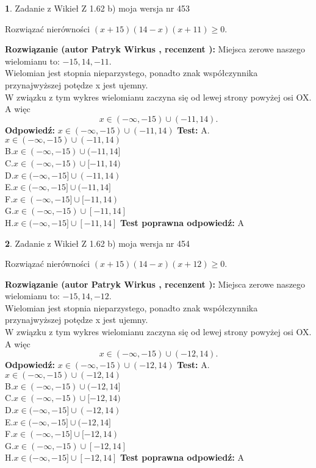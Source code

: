 \documentclass[12pt, a4paper]{article}
\theoremstyle{definition} %
\newtheorem{zad}{}
\newcommand{\zadStart}[1]{\begin{zad}#1\newline}
\newcommand{\zadStop}{\end{zad}}
\newcommand{\rozwStart}[2]{\noindent \textbf{Rozwiązanie (autor #1 , recenzent #2): }\newline}
\newcommand{\rozwStop}{\newline}
\newcommand{\odpStart}{\noindent \textbf{Odpowiedź:}\newline}
\newcommand{\odpStop}{\newline}
\newcommand{\testStart}{\noindent \textbf{Test:}\newline}
\newcommand{\testStop}{\newline}
\newcommand{\kluczStart}{\noindent \textbf{Test poprawna odpowiedź:}\newline}
\newcommand{\kluczStop}{\newline}
\begin{document}
\zadStart{Zadanie z Wikieł Z 1.62 b) moja wersja nr 453}

Rozwiązać nierówności $(x+15)(14-x)(x+11)\ge0$.
\zadStop
\rozwStart{Patryk Wirkus}{}
Miejsca zerowe naszego wielomianu to: $-15, 14, -11$.\\
Wielomian jest stopnia nieparzystego, ponadto znak współczynnika przy\linebreak najwyższej potędze x jest ujemny.\\ W związku z tym wykres wielomianu zaczyna się od lewej strony powyżej osi OX. A więc $$x \in (-\infty,-15) \cup (-11,14).$$
\rozwStop
\odpStart
$x \in (-\infty,-15) \cup (-11,14)$
\odpStop
\testStart
A.$x \in (-\infty,-15) \cup (-11,14)$\\
B.$x \in (-\infty,-15) \cup (-11,14]$\\
C.$x \in (-\infty,-15) \cup [-11,14)$\\
D.$x \in (-\infty,-15] \cup (-11,14)$\\
E.$x \in (-\infty,-15] \cup (-11,14]$\\
F.$x \in (-\infty,-15] \cup [-11,14)$\\
G.$x \in (-\infty,-15) \cup [-11,14]$\\
H.$x \in (-\infty,-15] \cup [-11,14]$
\testStop
\kluczStart
A
\kluczStop



\zadStart{Zadanie z Wikieł Z 1.62 b) moja wersja nr 454}

Rozwiązać nierówności $(x+15)(14-x)(x+12)\ge0$.
\zadStop
\rozwStart{Patryk Wirkus}{}
Miejsca zerowe naszego wielomianu to: $-15, 14, -12$.\\
Wielomian jest stopnia nieparzystego, ponadto znak współczynnika przy\linebreak najwyższej potędze x jest ujemny.\\ W związku z tym wykres wielomianu zaczyna się od lewej strony powyżej osi OX. A więc $$x \in (-\infty,-15) \cup (-12,14).$$
\rozwStop
\odpStart
$x \in (-\infty,-15) \cup (-12,14)$
\odpStop
\testStart
A.$x \in (-\infty,-15) \cup (-12,14)$\\
B.$x \in (-\infty,-15) \cup (-12,14]$\\
C.$x \in (-\infty,-15) \cup [-12,14)$\\
D.$x \in (-\infty,-15] \cup (-12,14)$\\
E.$x \in (-\infty,-15] \cup (-12,14]$\\
F.$x \in (-\infty,-15] \cup [-12,14)$\\
G.$x \in (-\infty,-15) \cup [-12,14]$\\
H.$x \in (-\infty,-15] \cup [-12,14]$
\testStop
\kluczStart
A
\kluczStop
\end{document}
